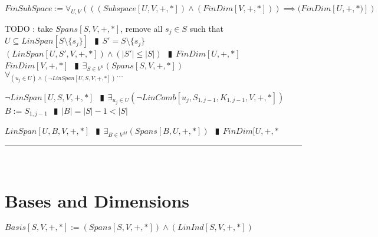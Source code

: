 \documentclass{book}
\newcommand{\abr}{:=}
\newcommand{\pipe}{$\phantom{(}\vrectangleblack\phantom{)}$}
\newcommand{\pr}[1]{\left(#1\right)}
\begin{document}
$FinSubSpace \abr \forall_{U, V}\pr{\pr{(Subspace[U, V, +, *])\land (FinDim[V, +, *])} \implies (FinDim[U, +, *)]}$
\begin{enumerate}
  \lit TODO : take $Spans[S, V, +, *]$, remove all $s_j \in S$ such that $U \subseteq LinSpan[S \setminus \{s_j\}]$ \pipe $S' = S \setminus \{s_j\}$ \\
    $(LinSpan[U, S', V, +, *]) \land (|S'| \leq |S|)$ \pipe $FinDim[U, +, *]$
  \lit $FinDim[V, +, *]$ \pipe $\exists_{S \in V^n}(Spans[S, V, +, *])$
  \lit $\forall_{(u_j \in U) \land (\lnot LinSpan[U, S, V, +, *])} \ldots$
  \begin{enumerate}
    \lit $\lnot LinSpan[U, S, V, +, *]$ \pipe $\exists_{u_j \in U}(\lnot LinComb[u_j, S_{1, j - 1}, K_{1, j - 1}, V, +, *])$
    \lit $B \abr S_{1, j - 1}$ \pipe $|B| = |S| - 1 < |S|$
  \end{enumerate}
  \lit $LinSpan[U, B, V, +, *]$ \pipe $\exists_{B \in V^M}(Spans[B, U, +, *])$ \pipe $FinDim[U, +, *$
\end{enumerate} \vspace{.75mm} \hrule \vspace{.75mm} \ \\ 

\section{Bases and Dimensions}
$Basis[S, V, +, *] \abr (Spans[S, V, +, *]) \land (LinInd[S, V, +, *])$ \\
\end{document}
